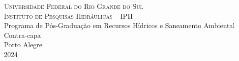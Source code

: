 \documentclass[./main.tex]{subfiles}
\begin{document}
\doublespacing %
\large
\newpage
\thispagestyle{fancy}
\begin{center}
	\textsc{Universidade Federal do Rio Grande do Sul} \\	
	\textsc{Instituto de Pesquisas Hidráulicas -- IPH}\\		
	Programa de Pós-Graduação em Recursos Hídricos e Saneamento Ambiental\\
        \vspace{30mm}
        Contra-capa\\		
	\vspace{130mm}
	Porto Alegre\\
	2024
\end{center}
\clearpage
\singlespacing
\end{document}
